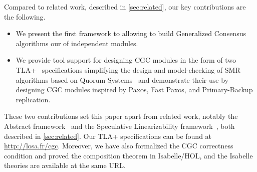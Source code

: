 Compared to related work, described in \cref{sec:related}, our key contributions are the following.
\begin{itemize}
    \item We present the first framework to allowing to build Generalized Consensus algorithms our of independent modules.
    \item We provide tool support for designing CGC modules in the form of two TLA+~\cite{Lamport02SpecifyingSystems} specifications simplifying the design and model-checking of SMR algorithms based on Quorum Systems~\cite{GuerraouiVukolic10RefinedQuorumSystems} and demonstrate their use by designing CGC modules inspired by Paxos, Fast Paxos, and Primary-Backup replication.
\end{itemize}
These two contributions set this paper apart from related work, notably the Abstract framework~\cite{GuerraouiETAL10Next700BftProtocols} and the Speculative Linearizability framework~\cite{GuerraouiKuncakLosa12SpeculativeLinearizability}, both described in \cref{sec:related}.
Our TLA+ specifications can be found at \url{http://losa.fr/cgc}.
Moreover, we have also formalized the CGC correctness condition and proved the composition theorem in Isabelle/HOL\@, and the Isabelle theories are available at the same URL\@.
